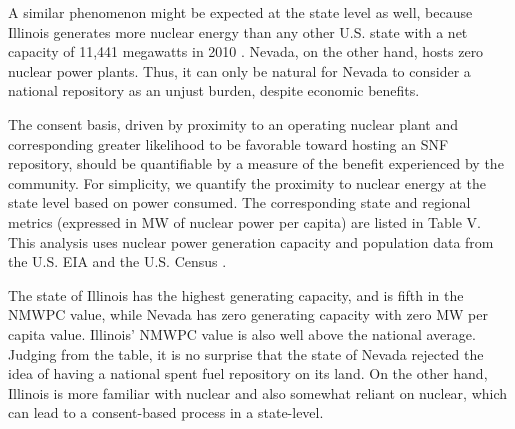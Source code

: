 A similar phenomenon might be expected at the state level as well, because 
Illinois generates more nuclear energy than any other U.S.  state with a net 
capacity of 11,441 megawatts in 2010 \cite{eia_state_2012}. Nevada, on the other 
hand, hosts zero nuclear power plants. Thus, it can only be natural for Nevada 
to consider a national repository as an unjust burden, despite economic 
benefits.  

The consent basis, driven by proximity to an operating nuclear plant and 
corresponding greater likelihood to be favorable toward hosting an \gls{SNF} 
repository, should be quantifiable by a measure of the benefit experienced by 
the community.  For simplicity, we quantify the proximity to nuclear energy at 
the state level  based on power consumed. The corresponding state and regional 
metrics (expressed in MW of nuclear power per capita) are listed in Table V. This 
analysis uses nuclear power generation capacity and population data from the 
U.S. \gls{EIA} \cite{eia_state_2012} and the U.S. Census \cite{census}.  

\begin{table}[h]
	
	\centering
	\caption {\gls{NMWPC} values for different states}

	\end{table}
	
The state of Illinois has the highest generating capacity, and is fifth in the \gls{NMWPC}
 value, while Nevada has zero generating capacity with zero MW per capita value. 
Illinois' \gls{NMWPC} value is also well above the national average. Judging from the
table, it is no surprise that the state of Nevada rejected the idea of having a national
spent fuel repository on its land. On the other hand, Illinois is more familiar with 
nuclear and also somewhat reliant on nuclear, which can lead to a consent-based process
in a state-level. 

